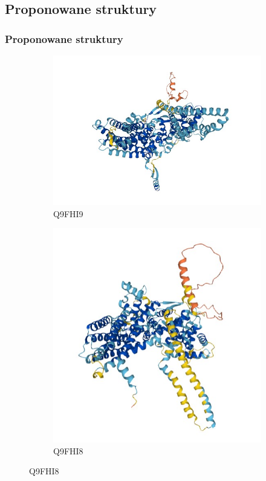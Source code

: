 \documentclass{beamer}
\begin{document}
\subsection{Proponowane struktury}
\begin{frame}
    \frametitle{Proponowane struktury}
    \begin{figure}
        \centering
    \begin{subfigure}{.5\textwidth}
        \centering
        \includegraphics[scale = 0.5]{70img.jpg}
        \caption{Q9FHI9}
        \label{fig:70protein}
    \end{subfigure}%
    \begin{subfigure}{.5\textwidth}
        \centering
        \includegraphics[scale = 0.5]{80img.jpg}
        \caption{Q9FHI8}
        \label{fig:80protein}
    \end{subfigure}
    \end{figure}
\end{frame}
\end{document}
